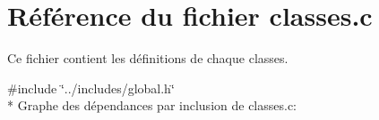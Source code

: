 \hypertarget{a00013}{}\section{Référence du fichier classes.\+c}
\label{a00013}


Ce fichier contient les définitions de chaque classes.  


{\ttfamily \#include \char`\"{}../includes/global.\+h\char`\"{}}\\*
Graphe des dépendances par inclusion de classes.\+c\+:
